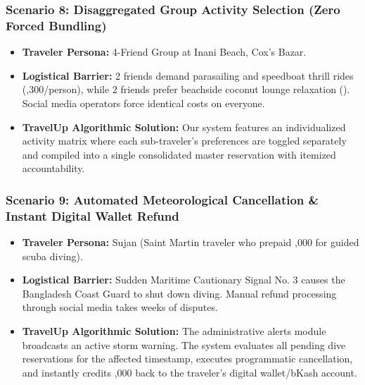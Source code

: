 \documentclass[11pt,a4paper]{article}
\begin{document}
\subsubsection{Scenario 8: Disaggregated Group Activity Selection (Zero Forced Bundling)}
\begin{itemize}[leftmargin=*]
    \item \textbf{Traveler Persona:} 4-Friend Group at Inani Beach, Cox's Bazar.
    \item \textbf{Logistical Barrier:} 2 friends demand parasailing and speedboat thrill rides (,300/person), while 2 friends prefer beachside coconut lounge relaxation (). Social media operators force identical costs on everyone.
    \item \textbf{TravelUp Algorithmic Solution:} Our system features an individualized activity matrix where each sub-traveler's preferences are toggled separately and compiled into a single consolidated master reservation with itemized accountability.
\end{itemize}

\subsubsection{Scenario 9: Automated Meteorological Cancellation \& Instant Digital Wallet Refund}
\begin{itemize}[leftmargin=*]
    \item \textbf{Traveler Persona:} Sujan (Saint Martin traveler who prepaid ,000 for guided scuba diving).
    \item \textbf{Logistical Barrier:} Sudden Maritime Cautionary Signal No. 3 causes the Bangladesh Coast Guard to shut down diving. Manual refund processing through social media takes weeks of disputes.
    \item \textbf{TravelUp Algorithmic Solution:} The administrative alerts module broadcasts an active storm warning. The system evaluates all pending dive reservations for the affected timestamp, executes programmatic cancellation, and instantly credits ,000 back to the traveler's digital wallet/bKash account.
\end{itemize}
\end{document}
